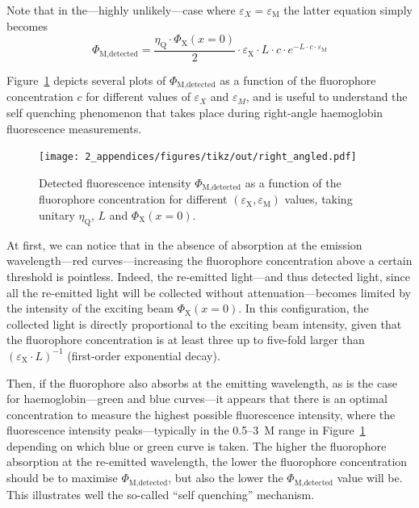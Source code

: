 Note that in the---highly unlikely---case where $\varepsilon_X = \varepsilon_\text{M}$ the latter equation simply becomes
\begin{equation}
	\Phi_\text{M,detected} = \frac{\eta_\text{Q} \cdot \Phi_\text{X}(x=0)}{2} \cdot \varepsilon_\text{X} \cdot L \cdot c \cdot e^{-L\cdot c \cdot \varepsilon_\text{M}}
\end{equation}


Figure~\ref{annfig:fluo_quenching:fluo_right_curves} depicts several plots of $\Phi_\text{M,detected}$ as a function of the fluorophore concentration $c$ for different values of $\varepsilon_X$ and $\varepsilon_M$, and is useful to understand the self quenching phenomenon that takes place during right-angle haemoglobin fluorescence measurements.

\begin{figure}
	\centering
	\texttt{[image: 2\_appendices/figures/tikz/out/right\_angled.pdf]}
	\caption[Detected fluorescence intensity in the right-angle optics case.]{Detected fluorescence intensity $\Phi_\text{M,detected}$ as a function of the fluorophore concentration for different $(\varepsilon_\text{X},\varepsilon_\text{M})$ values, taking unitary $\eta_\text{Q}$, $L$ and $\Phi_\text{X}(x=0)$.}
	\label{annfig:fluo_quenching:fluo_right_curves}
\end{figure}

At first, we can notice that in the absence of absorption at the emission wavelength---red curves---increasing the fluorophore concentration above a certain threshold is pointless. Indeed, the re-emitted light---and thus detected light, since all the re-emitted light will be collected without attenuation---becomes limited by the intensity of the exciting beam $\Phi_\text{X}(x=0)$. In this configuration, the collected light is directly proportional to the exciting beam intensity, given that the fluorophore concentration is at least three up to five-fold larger than $(\varepsilon_\text{X} \cdot L)^{-1}$ (first-order exponential decay).

Then, if the fluorophore also absorbs at the emitting wavelength, as is the case for haemo\-globin---green and blue curves---it appears that there is an optimal concentration to measure the highest possible fluorescence intensity, where the fluorescence intensity peaks---typically in the 0.5--3~M range in Figure~\ref{annfig:fluo_quenching:fluo_right_curves} depending on which blue or green curve is taken. The higher the fluorophore absorption at the re-emitted wavelength, the lower the fluorophore concentration should be to maximise $\Phi_\text{M,detected}$, but also the lower the $\Phi_\text{M,detected}$ value will be. This illustrates well the so-called \enquote{self quenching} mechanism.

